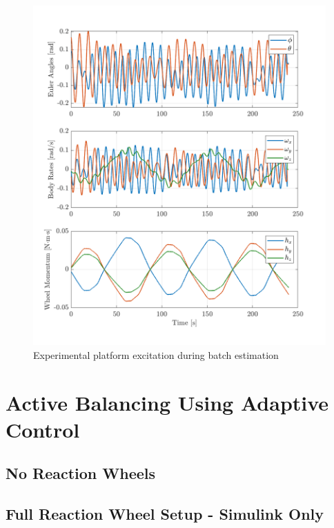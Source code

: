 \begin{figure}[!ht]
    \centering
    \includegraphics[width=\linewidth]{plots/LSR_hardware_excitation}
    \caption{Experimental platform excitation during batch estimation}
\end{figure}

\section{Active Balancing Using Adaptive Control}

\subsection{No Reaction Wheels}

\subsection{Full Reaction Wheel Setup - Simulink Only}


